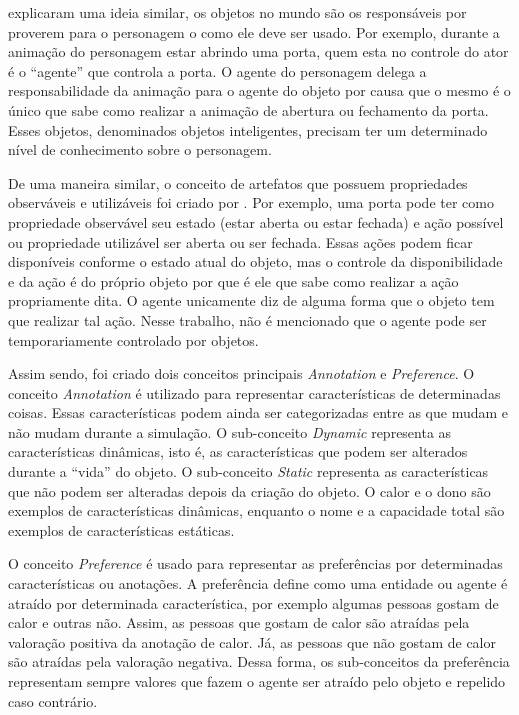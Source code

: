 \citet{kallmann1999modeling} explicaram uma ideia similar, os objetos no mundo
são os responsáveis por proverem para o personagem o como ele deve ser usado.
Por exemplo, durante a animação do personagem estar abrindo uma porta, quem esta
no controle do ator é o ``agente'' que controla a porta. O agente do
personagem delega a responsabilidade da animação para o agente do objeto por
causa que o mesmo é o único que sabe como realizar a animação de abertura ou
fechamento da porta. Esses objetos, denominados objetos inteligentes, precisam
ter um determinado nível de conhecimento sobre o personagem.

De uma maneira similar, o conceito de artefatos que possuem propriedades
observáveis e utilizáveis foi criado por \citet{ricci31cartago}. Por exemplo,
uma porta pode ter como propriedade observável seu estado (estar aberta ou
estar fechada) e ação possível ou propriedade utilizável ser aberta ou ser
fechada. Essas ações podem ficar disponíveis conforme o estado atual do
objeto, mas o controle da disponibilidade e da ação é do próprio objeto por
que é ele que sabe como realizar a ação propriamente dita. O agente unicamente
diz de alguma forma que o objeto tem que realizar tal ação. Nesse trabalho,
não é mencionado que o agente pode ser temporariamente controlado por
objetos.

Assim sendo, foi criado dois conceitos principais \emph{Annotation} e
\emph{Preference}. O conceito \emph{Annotation} é utilizado para representar
características de determinadas coisas. Essas características podem ainda
ser categorizadas entre as que mudam e não mudam durante a simulação. O
sub-conceito \emph{Dynamic} representa as características dinâmicas, isto é,
as características que podem ser alterados durante a ``vida'' do objeto. O
sub-conceito \emph{Static} representa as características que não podem ser
alteradas depois da criação do objeto. O calor e o dono são exemplos de
características dinâmicas, enquanto o nome e a capacidade total são exemplos
de características estáticas.

O conceito \emph{Preference} é usado para representar as preferências por
determinadas características ou anotações. A preferência define como uma entidade ou
agente é atraído por determinada característica, por exemplo algumas pessoas
gostam de calor e outras não. Assim, as pessoas que gostam de calor são
atraídas pela valoração positiva da anotação de calor. Já, as pessoas que não
gostam de calor são atraídas pela valoração negativa. Dessa forma, os
sub-conceitos da preferência representam sempre valores que fazem o agente ser
atraído pelo objeto e repelido caso contrário.

